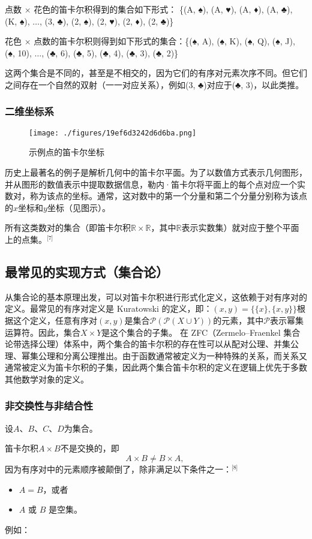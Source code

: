 点数 × 花色的笛卡尔积得到的集合如下形式：  
\{(A, ♠), (A, ♥), (A, ♦), (A, ♣), (K, ♠), \(\ldots\), (3, ♣), (2, ♠), (2, ♥), (2, ♦), (2, ♣)\}

花色 × 点数的笛卡尔积则得到如下形式的集合：\{(♠, A), (♠, K), (♠, Q), (♠, J), (♠, 10), \(\ldots\), (♣, 6), (♣, 5), (♣, 4), (♣, 3), (♣, 2)\}

这两个集合是不同的，甚至是不相交的，因为它们的有序对元素次序不同。但它们之间存在一个自然的双射（一一对应关系），例如(3, ♣)对应于(♣, 3)，以此类推。
\subsubsection{二维坐标系}
\begin{figure}[ht]
\centering
\texttt{[image: ./figures/19ef6d3242d6d6ba.png]}
\caption{示例点的笛卡尔坐标} \label{fig_DKR_2}
\end{figure}
历史上最著名的例子是解析几何中的笛卡尔平面。为了以数值方式表示几何图形，并从图形的数值表示中提取数据信息，勒内·笛卡尔将平面上的每个点对应一个实数对，称为该点的坐标。通常，这对数中的第一个分量和第二个分量分别称为该点的\(x\)坐标和\(y\)坐标（见图示）。

所有这类数对的集合（即笛卡尔积\( \mathbb{R} \times \mathbb{R} \)，其中\( \mathbb{R} \)表示实数集）就对应于整个平面上的点集。\(^\text{[7]}\)
\subsection{最常见的实现方式（集合论）}  
从集合论的基本原理出发，可以对笛卡尔积进行形式化定义，这依赖于对有序对的定义。最常见的有序对定义是 Kuratowski 的定义，即：\((x, y) = \{\{x\}, \{x, y\}\}\)根据这个定义，任意有序对\( (x, y) \)是集合\(\mathcal{P}(\mathcal{P}(X \cup Y))\)的元素，其中\( \mathcal{P} \)表示幂集运算符。因此，集合\( X \times Y \)是这个集合的子集。
在 ZFC（Zermelo–Fraenkel 集合论带选择公理）体系中，两个集合的笛卡尔积的存在性可以从配对公理、并集公理、幂集公理和分离公理推出。由于函数通常被定义为一种特殊的关系，而关系又通常被定义为笛卡尔积的子集，因此两个集合笛卡尔积的定义在逻辑上优先于多数其他数学对象的定义。
\subsubsection{非交换性与非结合性} 
设\( A \)、\( B \)、\( C \)、\( D \)为集合。

笛卡尔积\( A \times B \)不是交换的，即  
\[
A \times B \ne B \times A,~
\]  
因为有序对中的元素顺序被颠倒了，除非满足以下条件之一：\(^\text{[8]}\)
\begin{itemize}
\item \( A = B \)，或者  
\item \( A \) 或 \( B \) 是空集。
\end{itemize}
例如：

